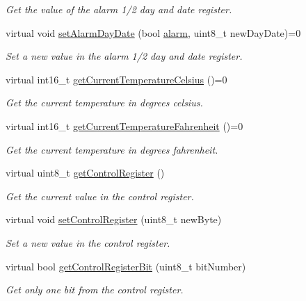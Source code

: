 \begin{DoxyCompactItemize}
\begin{DoxyCompactList}\small\item\em Get the value of the alarm 1/2 day and date register. \end{DoxyCompactList}\item 
virtual void \mbox{\hyperlink{classreal_time_clock_a2c2bb16a7fc59f463fb3aaed2fcd1926}{set\+Alarm\+Day\+Date}} (bool \mbox{\hyperlink{classalarm}{alarm}}, uint8\+\_\+t new\+Day\+Date)=0
\begin{DoxyCompactList}\small\item\em Set a new value in the alarm 1/2 day and date register. \end{DoxyCompactList}\item 
virtual int16\+\_\+t \mbox{\hyperlink{classreal_time_clock_ac662348fcf7b5fb51fdcf79f83958a33}{get\+Current\+Temperature\+Celsius}} ()=0
\begin{DoxyCompactList}\small\item\em Get the current temperature in degrees celsius. \end{DoxyCompactList}\item 
virtual int16\+\_\+t \mbox{\hyperlink{classreal_time_clock_a8fe956100fc4e339cd68ab413465f666}{get\+Current\+Temperature\+Fahrenheit}} ()=0
\begin{DoxyCompactList}\small\item\em Get the current temperature in degrees fahrenheit. \end{DoxyCompactList}\item 
virtual uint8\+\_\+t \mbox{\hyperlink{classreal_time_clock_a13820319507d89a62a5b37b252ea6d0d}{get\+Control\+Register}} ()
\begin{DoxyCompactList}\small\item\em Get the current value in the control register. \end{DoxyCompactList}\item 
virtual void \mbox{\hyperlink{classreal_time_clock_ab4034ba75fb65a55fb725c37e89f7626}{set\+Control\+Register}} (uint8\+\_\+t new\+Byte)
\begin{DoxyCompactList}\small\item\em Set a new value in the control register. \end{DoxyCompactList}\item 
virtual bool \mbox{\hyperlink{classreal_time_clock_a762441ffb1fbee666cd1642edfb8c929}{get\+Control\+Register\+Bit}} (uint8\+\_\+t bit\+Number)
\begin{DoxyCompactList}\small\item\em Get only one bit from the control register. \end{DoxyCompactList}\item 

\end{DoxyCompactItemize}
